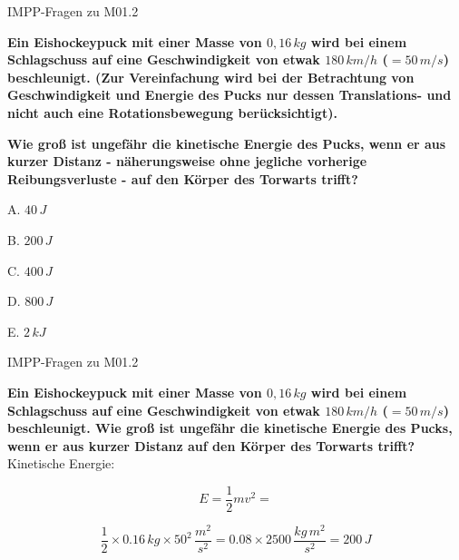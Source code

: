 \documentclass{beamer}
\begin{document}
 
 
\begin{frame}{IMPP-Fragen zu M01.2}
    
    \textbf{
    Ein Eishockeypuck mit einer Masse von \(0,16\,kg\) wird bei einem Schlagschuss auf eine Geschwindigkeit von etwak \(180\,km/h\) (\(=50\, m/s\)) beschleunigt. (Zur Vereinfachung wird bei der Betrachtung von Geschwindigkeit und Energie des Pucks nur dessen Translations- und nicht auch eine Rotationsbewegung berücksichtigt).
    } 
    
    \textbf{
    Wie groß ist ungefähr die kinetische Energie des Pucks, wenn er aus kurzer Distanz - näherungsweise ohne jegliche vorherige Reibungsverluste - auf den Körper des Torwarts trifft?
    }\\[0.2 cm]

\begin{description}
\item{A.} \(40\,J\)
\item{B.} \(200\,J\) %
\item{C.} \(400\,J\)
\item{D.} \(800\,J\)
\item{E.} \(2\,kJ\)

\end{description}
    
    
\end{frame}


\begin{frame}{IMPP-Fragen zu M01.2}
    
    \textbf{
    Ein Eishockeypuck mit einer Masse von \(0,16\,kg\) wird bei einem Schlagschuss auf eine Geschwindigkeit von etwak \(180\,km/h\) (\(=50\, m/s\)) beschleunigt.  Wie groß ist ungefähr die kinetische Energie des Pucks, wenn er aus kurzer Distanz auf den Körper des Torwarts trifft?
    }\\[0.2 cm]

Kinetische Energie:  

\[
E = \frac{1}{2} m v^2 = 
\]

\pause

\[
\frac{1}{2} \times 0.16\,kg \times  50^2 \,\frac{m^2}{s^2} = 0.08 \times 2500\, \frac{kg\,m^2}{s^2} = 200\, J
\]

\end{frame}
\end{document}

